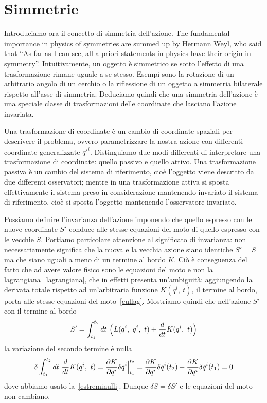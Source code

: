\section{Simmetrie}
    
    Introduciamo ora il concetto di simmetria dell'azione. The fundamental importance in physics of symmetries are summed up by Hermann Weyl, who said that ``As far as I can see, all a priori statements in physics have their origin in symmetry''. Intuitivamente, un oggetto è simmetrico se sotto l'effetto di una trasformazione rimane uguale a se stesso. Esempi sono la rotazione di un arbitrario angolo di un cerchio o la riflessione di un oggetto a simmetria bilaterale rispetto all'asse di simmetria. Deduciamo quindi che una simmetria dell'azione è una speciale classe di trasformazioni delle coordinate che lasciano l'azione invariata. 
    
    Una trasformazione di coordinate è un cambio di coordinate spaziali per descrivere il problema, ovvero parametrizzare la nostra azione con differenti coordinate generalizzate $q'^i$. Distinguiamo due modi differenti di interpretare una trasformazione di coordinate: quello passivo e quello attivo. Una trasformazione passiva è un cambio del sistema di riferimento, cioè l'oggetto viene descritto da due differenti osservatori; mentre in una trasformazione attiva si sposta effettivamente il sistema preso in considerazione mantenendo invariato il sistema di riferimento, cioè si sposta l'oggetto mantenendo l'osservatore invariato. 
    
    Possiamo definire l'invarianza dell'azione imponendo che quello espresso con le nuove coordinate $S'$ conduce alle stesse equazioni del moto di quello espresso con le vecchie $S$. Portiamo particolare attenzione al significato di invarianza: non necessariamente significa che la nuova e la vecchia azione siano identiche $S' = S$ ma che siano uguali a meno di un termine al bordo $K$. Ciò è conseguenza del fatto che ad avere valore fisico sono le equazioni del moto e non la lagrangiana~\eqref{lagrangiana}, che in effetti presenta un'ambiguità: aggiungendo la derivata totale rispetto ad un'arbitraria funzione $K(q^i, ~ t)$, il termine al bordo, porta alle stesse equazioni del moto~\eqref{eullag}. Mostriamo quindi che nell'azione $S'$ con il termine al bordo
    \begin{equation*}
        S' = \int_{t_1}^{t_2}dt~ \Big ( L(q^i, ~ \dot q^i, ~t) + \frac{d}{dt} K(q^i, ~t) \Big)
    \end{equation*}
    la variazione del secondo termine è nulla
    \begin{equation*}
        \delta \int_{t_1}^{t_2}dt~ \frac{d}{dt} K(q^i, ~t) = \frac{\partial K}{\partial q^i} \delta q^i \Big \vert_{t_1}^{t_2} = \frac{\partial K}{\partial q^i} \delta q^i (t_2) - \frac{\partial K}{\partial q^i} \delta q^i (t_1) = 0
    \end{equation*} 
    dove abbiamo usato la~\eqref{estreminulli}. Dunque $\delta S = \delta S'$ e le equazioni del moto non cambiano.

